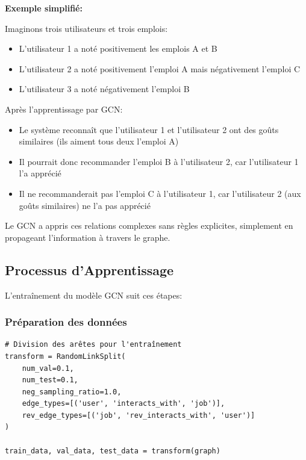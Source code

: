 \documentclass[12pt,a4paper]{article}
\begin{document}
\begin{examplebox}
\textbf{Exemple simplifié:}

Imaginons trois utilisateurs et trois emplois:
\begin{itemize}
    \item L'utilisateur 1 a noté positivement les emplois A et B
    \item L'utilisateur 2 a noté positivement l'emploi A mais négativement l'emploi C
    \item L'utilisateur 3 a noté négativement l'emploi B
\end{itemize}

Après l'apprentissage par GCN:
\begin{itemize}
    \item Le système reconnaît que l'utilisateur 1 et l'utilisateur 2 ont des goûts similaires (ils aiment tous deux l'emploi A)
    \item Il pourrait donc recommander l'emploi B à l'utilisateur 2, car l'utilisateur 1 l'a apprécié
    \item Il ne recommanderait pas l'emploi C à l'utilisateur 1, car l'utilisateur 2 (aux goûts similaires) ne l'a pas apprécié
\end{itemize}

Le GCN a appris ces relations complexes sans règles explicites, simplement en propageant l'information à travers le graphe.
\end{examplebox}

\subsection{Processus d'Apprentissage}

L'entraînement du modèle GCN suit ces étapes:

\subsubsection{Préparation des données}

\begin{lstlisting}[caption=Division des données pour l'entraînement]
# Division des arêtes pour l'entraînement
transform = RandomLinkSplit(
    num_val=0.1,
    num_test=0.1,
    neg_sampling_ratio=1.0,
    edge_types=[('user', 'interacts_with', 'job')],
    rev_edge_types=[('job', 'rev_interacts_with', 'user')]
)

train_data, val_data, test_data = transform(graph)
\end{lstlisting}
\end{document}
